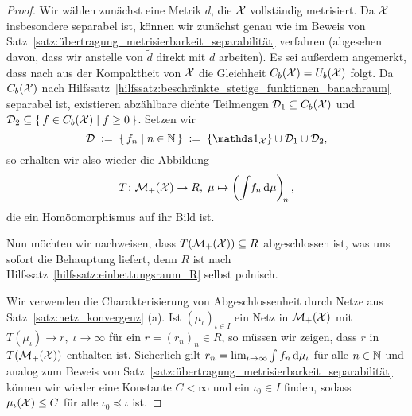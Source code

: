 \documentclass[../thesis/thesis.tex]{subfiles}
\begin{document}
	\begin{proof}
		Wir wählen zunächst eine Metrik $d$, die $\mathcal{X}$ vollständig metrisiert. Da $\mathcal{X}$ insbesondere separabel ist, können wir zunächst genau wie 
		im Beweis von Satz~\ref{satz:übertragung_metrisierbarkeit_separabilität} verfahren
		(abgesehen davon, dass wir anstelle von $\tilde{d}$ direkt mit $d$ arbeiten). Es sei außerdem angemerkt, dass nach \cite[Satz 2.4.1]{Simon.2015} aus der Kompaktheit von $\mathcal{X}$ die Gleichheit $C_b(\mathcal{X}) = U_b(\mathcal{X})$ folgt. Da $C_b(\mathcal{X})$ nach Hilfssatz~\ref{hilfssatz:beschränkte_stetige_funktionen_banachraum} separabel ist, existieren abzählbare dichte Teilmengen $\mathcal{D}_1 \subseteq C_b(\mathcal{X})$ und $\mathcal{D}_2 \subseteq \left\{\, f \in C_b(\mathcal{X}) \; \middle| \; f \geq 0 \,\right\}$. Setzen wir 
		\[ \mathcal{D} \; \defby \; \setcomp{f_n}{n \in \N} \; \defby \; \set{\indfct_\X} \cup \mathcal{D}_1 \cup \mathcal{D}_2 \text{,} \] 
		so erhalten wir also wieder die Abbildung
		\[ T \colon \mathcal{M}_{+}(\mathcal{X}) \to R, \; \mu \mapsto \left( \int_{} \, f_n \, \mathrm{d}\mu \right)_{\! n}  \text{,} \]
		die ein Homöomorphismus auf ihr Bild ist. 
		
		Nun möchten wir nachweisen, dass $T(\mathcal{M}_{+}(\mathcal{X})) \subseteq R$ abgeschlossen ist, was uns sofort die Behauptung liefert, denn $R$ ist nach Hilfssatz~\ref{hilfssatz:einbettungsraum_R} selbst polnisch.
		
		Wir verwenden die Charakterisierung von Abgeschlossenheit 
		durch Netze aus Satz~\ref{satz:netz_konvergenz} (a). Ist $(\mu_\iota)_{\iota \in I}$ ein Netz in $\mathcal{M}_{+}(\mathcal{X})$ mit $T(\mu_\iota) \to r, \; \iota \to \infty$
		für ein $r = (r_n)_n \in R$, so müssen wir zeigen, dass $r$ in $T(\mathcal{M}_{+}(\mathcal{X}))$ enthalten ist. Sicherlich gilt
		$r_n = \lim_{\iota \to \infty} \int_{} \, f_n \, \mathrm{d}\mu_\iota$ für alle $n \in \mathbb{N}$ und analog zum Beweis von Satz~\ref{satz:übertragung_metrisierbarkeit_separabilität} 
		können wir wieder eine Konstante $C < \infty$ und ein $\iota_0 \in I$ finden, sodass $\mu_\iota(\mathcal{X}) \leq C$ für alle $\iota_0 \preceq \iota$ ist.
		

\end{proof}
\end{document}
